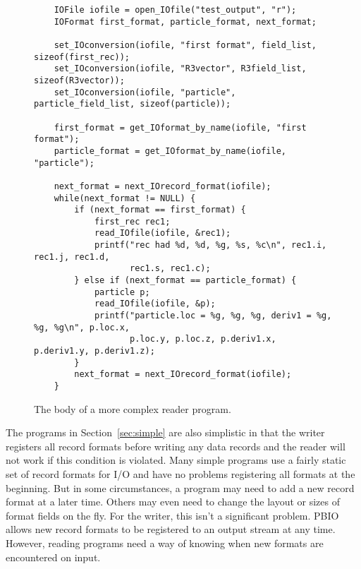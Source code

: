 \documentclass{article}
\begin{document}
\begin{figure}
\begin{verbatim}
    IOFile iofile = open_IOfile("test_output", "r");
    IOFormat first_format, particle_format, next_format;

    set_IOconversion(iofile, "first format", field_list, sizeof(first_rec));
    set_IOconversion(iofile, "R3vector", R3field_list, sizeof(R3vector));
    set_IOconversion(iofile, "particle", particle_field_list, sizeof(particle));

    first_format = get_IOformat_by_name(iofile, "first format");
    particle_format = get_IOformat_by_name(iofile, "particle");

    next_format = next_IOrecord_format(iofile);
    while(next_format != NULL) {
        if (next_format == first_format) {
            first_rec rec1;
            read_IOfile(iofile, &rec1);
            printf("rec had %d, %d, %g, %s, %c\n", rec1.i, rec1.j, rec1.d, 
                   rec1.s, rec1.c);
        } else if (next_format == particle_format) {
            particle p;
            read_IOfile(iofile, &p);
            printf("particle.loc = %g, %g, %g, deriv1 = %g, %g, %g\n", p.loc.x,
                   p.loc.y, p.loc.z, p.deriv1.x, p.deriv1.y, p.deriv1.z); 
        }
        next_format = next_IOrecord_format(iofile);
    }
\end{verbatim}
\caption{The body of a more complex reader program.\label{fig:complexread}}
\end{figure}

The programs in Section~\ref{sec:simple} are also simplistic in that the
writer registers all record formats before writing any data records and the
reader will not work if this condition is violated.  Many simple programs
use a fairly static set of record formats for I/O and have no problems
registering all formats at the beginning.  But in some circumstances,
a program may need to add a new record format at a later time.  Others may
even need to change the layout or sizes of format fields on the fly.  For the
writer, this isn't a significant problem.  PBIO allows new record formats to
be registered to an output stream at any time.  However, reading programs
need a way of knowing when new formats are encountered on input.  
\end{document}
